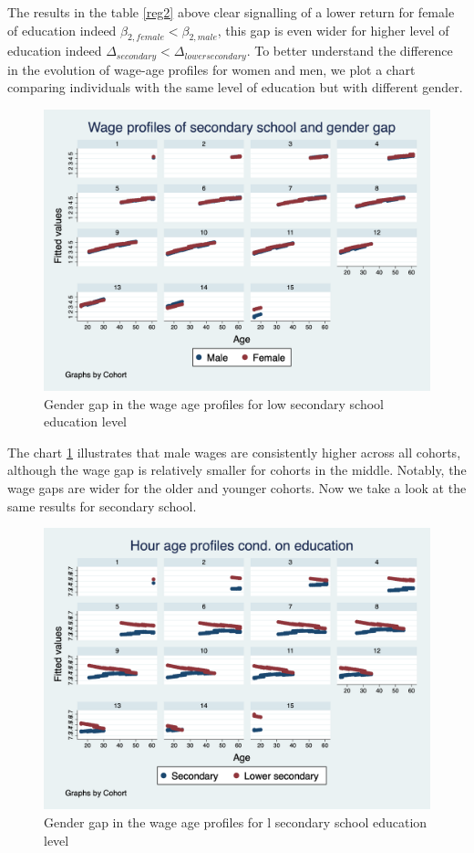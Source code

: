 \documentclass[14pt]{sistedes}
\begin{document}
The results in the table \ref{reg2} above clear signalling of a lower return for female of education indeed
$\beta_{2,female}<\beta_{2,male}$, this gap is even wider for higher level of education indeed
\(\Delta_{secondary}<\Delta_{lower secondary}\). To better understand the difference in the evolution of wage-age
profiles for women and men, we plot a chart comparing individuals with the same level of education but with different
gender.
\begin{figure}
    \centering
    \includegraphics[scale=0.3]{graph3.png}
    \caption{Gender gap in the wage age profiles for low secondary school education level}
    \label{fig:w_gend_l}
\end{figure}
The chart \ref{fig:w_gend_l} illustrates that male wages are consistently higher across all cohorts, although the wage
gap is relatively smaller for cohorts in the middle. Notably, the wage gaps are wider for the older and younger cohorts.
Now we take a look at the same results for secondary school. 
\begin{figure}
    \centering
    \includegraphics[scale=0.3]{graph4.png}
    \caption{Gender gap in the wage age profiles for l secondary school education level}
    \label{fig:w_gend_h}
\end{figure}
\end{document}
